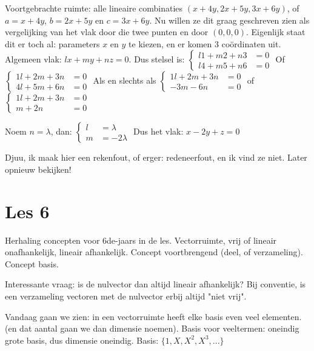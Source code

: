 \documentclass{article}
\begin{document}
Voortgebrachte ruimte: alle lineaire combinaties $(x+4y, 2x+5y, 3x+6y)$, of $a=x+4y$, $b=2x+5y$ en $c=3x+6y$. 
Nu willen ze dit graag geschreven zien als vergelijking van het vlak door die twee punten en door $(0,0,0)$. 
Eigenlijk staat dit er toch al: parameters $x$ en $y$ te kiezen, en er komen 3 co\"ordinaten uit. 
Algemeen vlak: $lx + my + nz = 0$. Dus stelsel is: 
$\left\{ \begin{aligned}
l1 + m2 + n3 &= 0 \\
l4 + m5 + n6 &= 0 
\end{aligned} \right.$ 
Of 
$\left\{ \begin{aligned}
1l + 2m + 3n &= 0 \\
4l + 5m + 6n &= 0 
\end{aligned} \right.$ 
Als en slechts als
$\left\{ \begin{aligned}
1l + 2m + 3n &= 0 \\
   - 3m - 6n &= 0 
\end{aligned} \right.$ 
of
$\left\{ \begin{aligned}
1l + 2m + 3n &= 0 \\
    m + 2n &= 0 
\end{aligned} \right.$ 

Noem $n=\lambda$, dan: 
$\left\{ \begin{aligned}
l  &=  \lambda \\
m &= -2 \lambda
\end{aligned} \right.$ 
Dus het vlak: $x -2  y + z = 0$

Djuu, ik maak hier een rekenfout, of erger: redeneerfout, en ik vind ze niet. Later opnieuw bekijken! 

\section{Les 6}

Herhaling concepten voor 6de-jaars in de les. Vectorruimte, vrij of lineair onafhankelijk, lineair afhankelijk. Concept voortbrengend (deel, of verzameling). Concept basis. 

Interessante vraag: is de nulvector dan altijd lineair afhankelijk? Bij conventie, is een verzameling vectoren met de nulvector erbij altijd "niet vrij". 

Vandaag gaan we zien: in een vectorruimte heeft elke basis even veel elementen. (en dat aantal gaan we dan dimensie noemen). 
Basis voor veeltermen: oneindig grote basis, dus dimensie oneindig. Basis: $\{1, X, X^2, X^3,...  \}$
\end{document}
